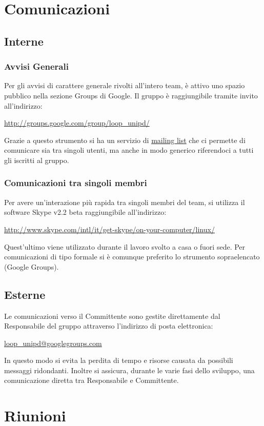 \documentclass[a4paper,11pt]{article}
\begin{document}
\pagebreak

\section{Comunicazioni}
\subsection{Interne}
\subsubsection{Avvisi Generali}
Per gli avvisi di carattere generale rivolti all'intero team, \`e attivo uno spazio pubblico nella sezione Groups di Google.
Il gruppo \`e raggiungibile tramite invito all'indirizzo:
\begin{center}
\url{http://groups.google.com/group/loop_unipd/}
\end{center}
Grazie a questo strumento si ha un servizio di \underline{mailing list} che ci permette di comunicare sia tra singoli utenti, ma anche in modo generico riferendoci a tutti gli iscritti al gruppo.
\subsubsection{Comunicazioni tra singoli membri}
Per avere un'interazione pi\`u rapida tra singoli membri del team, si utilizza il software Skype v2.2 beta raggiungibile all'indirizzo: 
\begin{center}
\url{http://www.skype.com/intl/it/get-skype/on-your-computer/linux/}
\end{center} 
Quest'ultimo viene utilizzato durante il lavoro svolto a casa o fuori sede. 
Per comunicazioni di tipo formale si \`e comunque preferito lo strumento sopraelencato (Google Groups).
\subsection{Esterne}
Le comunicazioni verso il Committente sono gestite direttamente dal Responsabile del gruppo attraverso l'indirizzo di posta elettronica:
\begin{center}
\url{loop_unipd@googlegroups.com}
\end{center}
In questo modo si evita la perdita di tempo e risorse causata da possibili messaggi ridondanti. Inoltre si assicura, durante le varie fasi dello sviluppo, una comunicazione diretta tra Responsabile e Committente. 
\newpage

\section{Riunioni}
\end{document}
